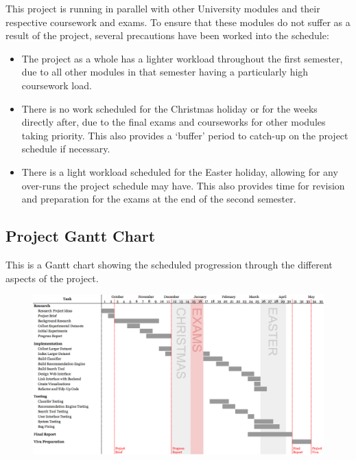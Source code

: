 \documentclass[12pt,a4paper]{article}
\begin{document}
This project is running in parallel with other University modules and their respective coursework and exams. To ensure that these modules do not suffer as a result of the project, several precautions have been worked into the schedule:
\begin{itemize}
    \item The project as a whole has a lighter workload throughout the first semester, due to all other modules in that semester having a particularly high coursework load.
    \item There is no work scheduled for the Christmas holiday or for the weeks directly after, due to the final exams and courseworks for other modules taking priority. This also provides a `buffer' period to catch-up on the project schedule if necessary.
    \item There is a light workload scheduled for the Easter holiday, allowing for any over-runs the project schedule may have. This also provides time for revision and preparation for the exams at the end of the second semester.
\end{itemize}

\pagebreak

\begin{landscape}
    \appendix
    \section{Project Gantt Chart}
    \label{appendix:gantt}
    This is a Gantt chart showing the scheduled progression through the different aspects of the project.

    \begin{figure}[H]
        \centering
        \includegraphics[height=0.85\textwidth]{gantt.png}
    \end{figure}
\end{landscape}
\end{document}
